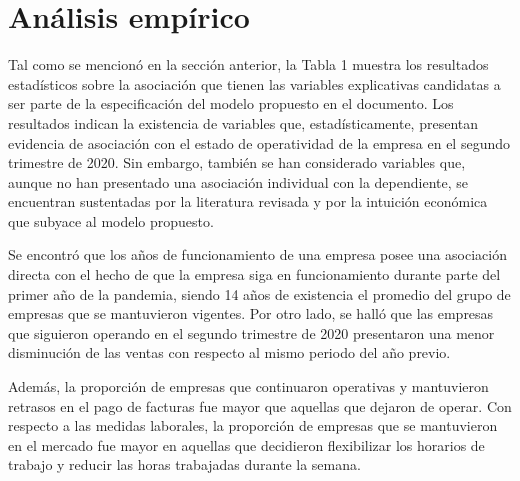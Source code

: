 \documentclass[12pt]{article}
\begin{document}
        \section{Análisis empírico}
        Tal como se mencionó en la sección anterior, la Tabla 1 muestra los resultados estadísticos sobre la asociación
        que tienen las variables explicativas candidatas a ser parte de la especificación del modelo propuesto en el documento.
        Los resultados indican la existencia de variables que, estadísticamente, presentan evidencia de asociación
        con el estado de operatividad de la empresa en el segundo trimestre de 2020. Sin embargo, también
        se han considerado variables que, aunque no han presentado una asociación individual con la dependiente,
        se encuentran sustentadas por la literatura revisada y por la intuición económica que subyace al modelo propuesto.

        Se encontró que los años de funcionamiento de una empresa posee una asociación directa con el hecho de que la empresa
        siga en funcionamiento durante parte del primer año de la pandemia, siendo 14 años de existencia el promedio del grupo
        de empresas que se mantuvieron vigentes. Por otro lado, se halló que las empresas que siguieron operando en el segundo
        trimestre de 2020 presentaron una menor disminución de las ventas con respecto al mismo periodo del año previo.

        Además, la proporción de empresas que continuaron operativas y mantuvieron retrasos en el pago de facturas fue
        mayor que aquellas que dejaron de operar. Con respecto a las medidas laborales, la proporción de empresas que
        se mantuvieron en el mercado fue mayor en aquellas que decidieron flexibilizar los horarios de trabajo y reducir
        las horas trabajadas durante la semana.
\end{document}
